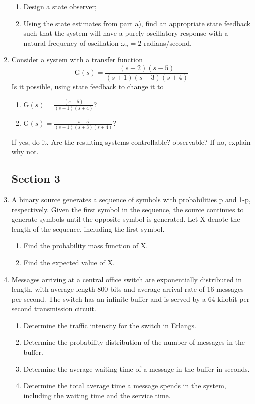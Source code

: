 \documentclass[main.tex]{subfiles}
\begin{document}
\begin{enumerate}
	\begin{enumerate}
	    \item Design a state observer;
	    \item Using the state estimates from part a), find an appropriate state feedback such that the system will have a purely oscillatory response with a natural frequency of oscillation $\omega_n = 2$ radians/second.
	\end{enumerate}
	
\item Consider a system with a transfer function 
$$\mathrm{G}(s)=\frac{(s-2)(s-5)}{(s+1)(s-3)(s+4)}$$
Is it possible, using \underline{state feedback} to change it to

    \begin{enumerate}
        \item $\mathrm{G}(s)=\frac{(s-5)}{(s+1)(s+4)}$?
        \item $\mathrm{G}(s)=\frac{s-5}{(s+1)(s+3)(s+4)}$?
    \end{enumerate}
    
If yes, do it. Are the resulting systems controllable? observable? If no, explain why not.

\subsection{Section 3}

\item A binary source generates a sequence of symbols with probabilities p and 1-p, respectively. Given the first symbol in the sequence, the source continues to generate symbols until the opposite symbol is generated. Let X denote the length of the sequence, including the first symbol.

    \begin{enumerate}
        \item Find the probability mass function of X.
        \item Find the expected value of X.
    \end{enumerate}
    
\item Messages arriving at a central office switch are exponentially distributed in length, with average length 800 bits and average arrival rate of 16 messages per second. The switch has an infinite buffer and is served by a 64 kilobit per second transmission circuit.

    \begin{enumerate}
        \item Determine the traffic intensity for the switch in Erlangs.
        \item Determine the probability distribution of the number of messages in the buffer.
        \item Determine the average waiting time of a message in the buffer in seconds.
        \item Determine the total average time a message spends in the system, including the waiting time and the service time.
    \end{enumerate}


\end{enumerate}
\end{document}
